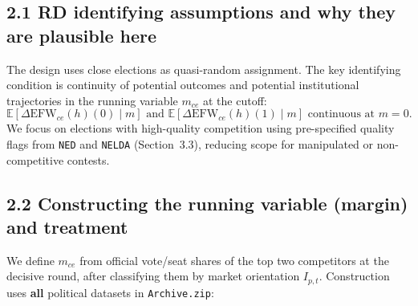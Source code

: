 \documentclass[11pt]{article}
\newcommand{\EFW}{\mathrm{EFW}}
\newcommand{\E}{\mathbb{E}}
\newcommand{\1}{\mathbf{1}}
\newcommand{\cid}{c}
\newcommand{\eid}{e}
\begin{document}
\subsection*{2.1 RD identifying assumptions and why they are plausible here}
The design uses close elections as quasi-random assignment. The key identifying condition is continuity of potential outcomes and potential institutional trajectories in the running variable $m_{\cid \eid}$ at the cutoff:
\[
\E[\Delta \EFW_{\cid \eid}(h)(0)\mid m] \text{ and } \E[\Delta \EFW_{\cid \eid}(h)(1)\mid m] \text{ continuous at } m=0.
\]
We focus on elections with high-quality competition using pre-specified quality flags from \texttt{NED} and \texttt{NELDA} (Section~3.3), reducing scope for manipulated or non-competitive contests.

\subsection*{2.2 Constructing the running variable (margin) and treatment}
We define $m_{\cid \eid}$ from official vote/seat shares of the top two competitors at the decisive round, after classifying them by market orientation $I_{p,t}$. Construction uses \textbf{all} political datasets in \texttt{Archive.zip}:
\end{document}
